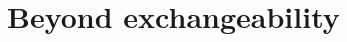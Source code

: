 \documentclass{beamer}
\newcommand{\Ca}{\mathcal{C}_{\alpha}}
\renewcommand{\S}{\mathcal{S}}
\renewcommand{\a}{\alpha}
\begin{document}


\section{Beyond exchangeability}

\end{document}
